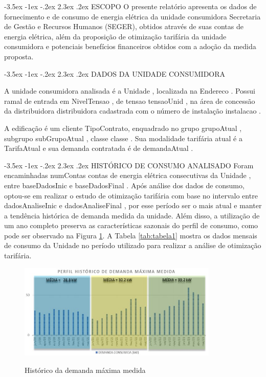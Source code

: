 \documentclass[a4paper,12pt]{abntex2}
\makeatletter
\renewcommand\chapter{\@startsection{chapter}{0}{\z@}%
  {-3.5ex \@plus -1ex \@minus -.2ex}%
  {2.3ex \@plus.2ex}%
  {\normalfont\large\bfseries}}
\makeatother
\begin{document}
\clearpage
\pagestyle{development}

\chapter{ESCOPO}
O presente relatório apresenta os dados de fornecimento e de consumo de energia elétrica da unidade consumidora Secretaria de Gestão e Recursos Humanos (SEGER), obtidos através de suas contas de energia elétrica, além da proposição de otimização tarifária da unidade consumidora e potenciais benefícios financeiros obtidos com a adoção da medida proposta.

\chapter{DADOS DA UNIDADE CONSUMIDORA}

A unidade consumidora analisada é a {{ Unidade }}, localizada na {{ Endereco }}. Possui ramal de entrada em {{ NivelTensao }}, de {{ tensao }} {{ tensaoUnid }}, na área de concessão da distribuidora {{ distribuidora }} cadastrada com o número de instalação {{ instalacao }}.

A edificação  é  um  cliente  {{TipoContrato}}, enquadrado no grupo {{ grupoAtual }}, subgrupo {{ subGrupoAtual }}, classe {{ classe }}. Sua modalidade tarifária atual é a {{ TarifaAtual }} e sua demanda contratada é de {{ demandaAtual }}.

\chapter{HISTÓRICO DE CONSUMO ANALISADO}
Foram  encaminhadas  {{ numContas }}  contas  de  energia  elétrica  consecutivas  da  {{ Unidade }}, 
entre  {{ baseDadosInic }} e {{ baseDadosFinal }}. Após análise dos dados de consumo, optou-se em realizar 
o  estudo  de  otimização  tarifária  com  base  no  intervalo  entre  {{ dadosAnaliseInic }}  e
{{ dadosAnaliseFinal }}, por esse período ser o mais atual e manter a tendência histórica de demanda medida da unidade.   
Além  disso,  a  utilização  de  um  ano  completo  preserva  as  características 
sazonais do perfil de consumo, como pode ser observado na Figura \ref{fig:grafico1}. A Tabela \ref{tab:tabela1} mostra 
os dados mensais de consumo da {{ Unidade }} no período utilizado para realizar a análise de otimização tarifária.


\begin{figure}[!ht]
    \centering
    \caption{Histórico da demanda máxima medida}
    \includegraphics[width=0.85\textwidth]{templates/FIGS/grafico1}
    \label{fig:grafico1}
\end{figure}
\end{document}
